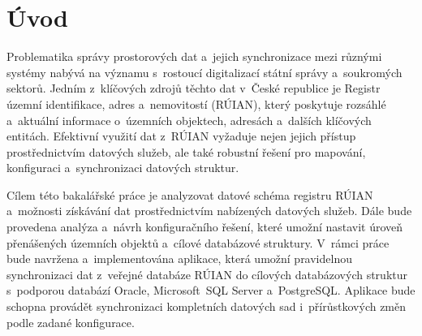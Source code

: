\chapter{Úvod}
Problematika správy prostorových dat a~jejich synchronizace mezi různými systémy 
nabývá na významu s~rostoucí digitalizací státní správy a~soukromých sektorů. 
Jedním z~klíčových zdrojů těchto dat v~České republice je Registr územní identifikace, 
adres a~nemovitostí (RÚIAN), který poskytuje rozsáhlé a~aktuální informace o~územních 
objektech, adresách a~dalších klíčových entitách. Efektivní využití dat z~RÚIAN vyžaduje 
nejen jejich přístup prostřednictvím datových služeb, ale také robustní řešení pro mapování, 
konfiguraci a~synchronizaci datových struktur.

Cílem této bakalářské práce je analyzovat datové schéma registru RÚIAN a~možnosti získávání 
dat prostřednictvím nabízených datových služeb. Dále bude provedena analýza a~návrh konfiguračního 
řešení, které umožní nastavit úroveň přenášených územních objektů a~cílové databázové struktury. 
V~rámci práce bude navržena a~implementována aplikace, která umožní pravidelnou synchronizaci dat 
z~veřejné databáze RÚIAN do cílových databázových struktur s~podporou databází Oracle, 
Microsoft~SQL Server a~PostgreSQL. Aplikace bude schopna provádět synchronizaci kompletních datových 
sad i~přírůstkových změn podle zadané konfigurace.